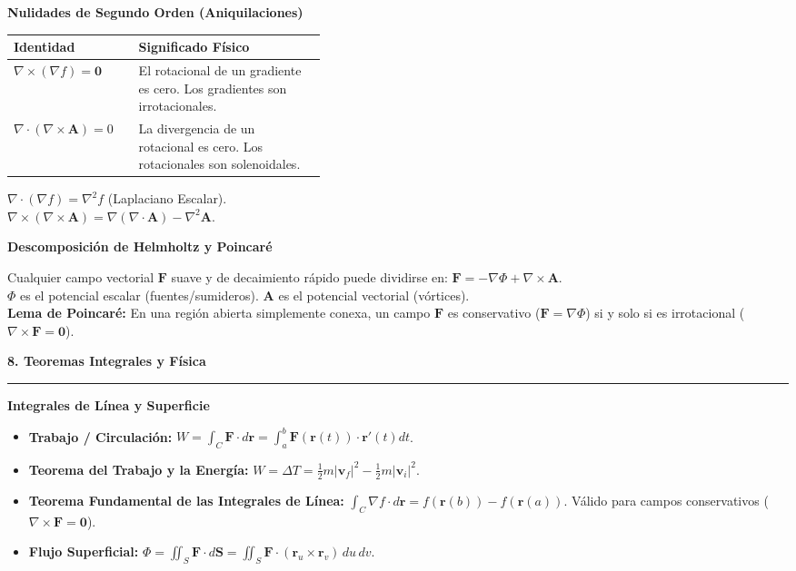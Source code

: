 \documentclass[10pt, landscape, twocolumn]{article}
\newcommand{\cheatsheetsection}[1]{
    \vspace{0.8em}
    {\color{themeblue}\large\bfseries #1} \par
    \vspace{-0.4em}
    {\color{themeblue}\rule{\linewidth}{1pt}} \par
    \vspace{0.3em}
}
\newcommand{\cheatsheetsubsection}[1]{
    \vspace{0.5em}
    {\color{themeblue}\normalsize\bfseries #1} \par
    \vspace{0.2em}
}
\begin{document}
\cheatsheetsubsection{Nulidades de Segundo Orden (Aniquilaciones)}
\begin{tabularx}{\linewidth}{|p{0.4\linewidth}|X|}
\hline
\textbf{Identidad} & \textbf{Significado Físico} \\ \hline
$\nabla \times (\nabla f) = \mathbf{0}$ & El rotacional de un gradiente es cero. Los gradientes son irrotacionales. \\ \hline
$\nabla \cdot (\nabla \times \mathbf{A}) = 0$ & La divergencia de un rotacional es cero. Los rotacionales son solenoidales. \\ \hline
\end{tabularx}
$\nabla \cdot (\nabla f) = \nabla^2 f$ (Laplaciano Escalar). \\
$\nabla \times (\nabla \times \mathbf{A}) = \nabla(\nabla \cdot \mathbf{A}) - \nabla^2 \mathbf{A}$.

\cheatsheetsubsection{Descomposición de Helmholtz y Poincaré}
Cualquier campo vectorial $\mathbf{F}$ suave y de decaimiento rápido puede dividirse en: $\mathbf{F} = -\nabla \Phi + \nabla \times \mathbf{A}$. \\
$\Phi$ es el potencial escalar (fuentes/sumideros). $\mathbf{A}$ es el potencial vectorial (vórtices). \\
\textbf{Lema de Poincaré:} En una región abierta simplemente conexa, un campo $\mathbf{F}$ es conservativo ($\mathbf{F} = \nabla \Phi$) si y solo si es irrotacional ($\nabla \times \mathbf{F} = \mathbf{0}$).

\cheatsheetsection{8. Teoremas Integrales y Física}

\cheatsheetsubsection{Integrales de Línea y Superficie}
\begin{itemize}[leftmargin=*, nosep]
    \item \textbf{Trabajo / Circulación:} $W = \int_C \mathbf{F} \cdot d\mathbf{r} = \int_a^b \mathbf{F}(\mathbf{r}(t)) \cdot \mathbf{r}'(t) dt$.
    \item \textbf{Teorema del Trabajo y la Energía:} $W = \Delta T = \frac{1}{2}m|\mathbf{v}_f|^2 - \frac{1}{2}m|\mathbf{v}_i|^2$.
    \item \textbf{Teorema Fundamental de las Integrales de Línea:} $\int_C \nabla f \cdot d\mathbf{r} = f(\mathbf{r}(b)) - f(\mathbf{r}(a))$. Válido para campos conservativos ($\nabla \times \mathbf{F} = \mathbf{0}$).
    \item \textbf{Flujo Superficial:} $\Phi = \iint_S \mathbf{F} \cdot d\mathbf{S} = \iint_S \mathbf{F} \cdot (\mathbf{r}_u \times \mathbf{r}_v) \, du \, dv$.
\end{itemize}
\end{document}
